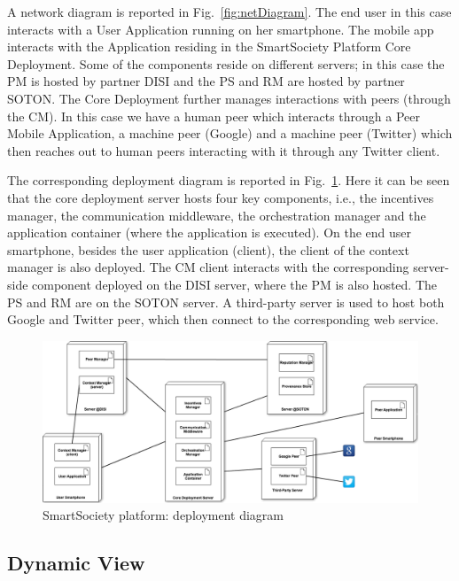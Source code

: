 A network diagram is reported in Fig.~\ref{fig:netDiagram}. The end user in this case interacts with a User Application running on her smartphone. The mobile app interacts with the Application residing in the SmartSociety Platform Core Deployment. Some of the components reside on different servers; in this case the PM is hosted by partner DISI and the PS and RM are hosted by partner SOTON. The Core Deployment further manages interactions with peers (through the CM). In this case we have a human peer which interacts through a Peer Mobile Application, a machine peer (Google) and a machine peer (Twitter) which then reaches out to human peers interacting with it through any Twitter client.



The corresponding deployment diagram is reported in Fig.~\ref{fig:deployDiagram}. Here it can be seen that the core deployment server hosts four key components, i.e., the incentives manager, the communication middleware, the orchestration manager and the application container (where the application is executed). On the end user smartphone, besides the user application (client), the client of the context manager is also  deployed. The CM client interacts with the corresponding server-side component deployed on the DISI server, where the PM is also hosted. The PS and RM are on the SOTON server. A third-party server is used to host both Google and Twitter peer, which then connect to the corresponding web service.
\begin{figure}
 \centering
 \includegraphics[width=1\textwidth]{figs/deploymentView}
 \caption{SmartSociety platform: deployment diagram}
 \label{fig:deployDiagram}
\end{figure}
\subsection{Dynamic View}

